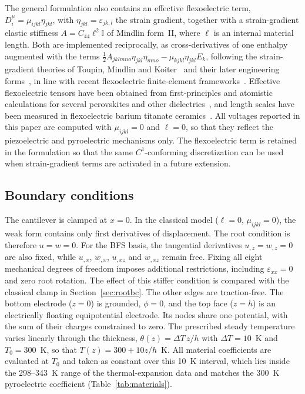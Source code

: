 \documentclass[a4paper,12pt]{elsarticle}
\begin{document}
The general formulation also contains an effective flexoelectric term,
$D_i^\mu=\mu_{ijkl}\eta_{jkl}$, with $\eta_{jkl}=\varepsilon_{jk,l}$ the strain
gradient, together with a strain-gradient elastic stiffness
$A=C_{44}\ell^2\mathbb{I}$ of Mindlin form~II, where $\ell$ is an internal material
length. Both are implemented reciprocally, as cross-derivatives of one enthalpy
augmented with the terms
$\tfrac12A_{jklmno}\eta_{jkl}\eta_{mno}-\mu_{kjkl}\eta_{jkl}E_k$, following the
strain-gradient theories of Toupin, Mindlin and Koiter~\cite{Toupin1962,Mindlin1964,MindlinEshel1968} and their later engineering forms~\cite{FleckHutchinson1997,Lam2003,AskesAifantis2011}, in line with recent flexoelectric
finite-element frameworks~\cite{Mao2016,MaoPurohit2014,Abdollahi2014}. Effective flexoelectric tensors have
been obtained from first-principles and atomistic calculations for several perovskites
and other dielectrics~\cite{MarangantiSharma2009,HongVanderbilt2011,Stengel2013}, and length scales have
been measured in flexoelectric barium titanate ceramics~\cite{MaCross2006,Huang2007}. All voltages reported in this paper are computed with
$\mu_{ijkl}=0$ and $\ell=0$, so that they reflect the piezoelectric and pyroelectric
mechanisms only. The flexoelectric term is retained in the formulation so that the
same $C^1$-conforming discretization can be used when strain-gradient terms are
activated in a future extension.

\subsection{Boundary conditions}
\label{sec:bcs}

The cantilever is clamped at $x=0$. In the classical model
($\ell=0$, $\mu_{ijkl}=0$), the weak form contains only first
derivatives of displacement. The root condition is therefore
$u=w=0$. For the BFS basis, the tangential derivatives
$u_{,z}=w_{,z}=0$ are also fixed, while $u_{,x}$, $w_{,x}$,
$u_{,xz}$ and $w_{,xz}$ remain free. Fixing all eight mechanical
degrees of freedom imposes additional restrictions, including
$\varepsilon_{xx}=0$ and zero root rotation. The effect of this
stiffer condition is compared with the classical clamp in
Section~\ref{sec:rootbc}. The other edges are traction-free.
The bottom electrode ($z=0$) is grounded, $\phi=0$, and the top face
($z=h$) is an electrically floating equipotential electrode. Its nodes
share one potential, with the sum of their charges constrained to zero.
The prescribed steady temperature varies linearly through the thickness,
$\theta(z)=\Delta T\,z/h$ with $\Delta T=10$~K and $T_0=300$~K, so that
$T(z)=300+10z/h$~K. All material coefficients are evaluated at $T_0$ and taken as
constant over this 10~K interval, which lies inside the 298--343~K range of the
thermal-expansion data and matches the 300~K
pyroelectric coefficient (Table~\ref{tab:materials}).
\end{document}
